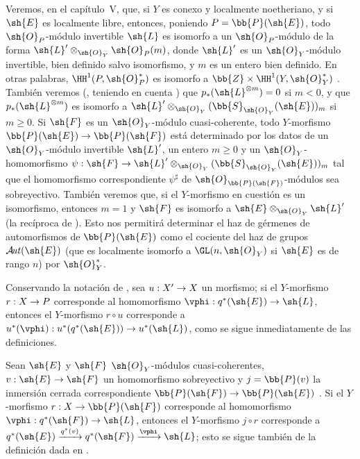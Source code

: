 \documentclass[oneside,10pt]{amsart}
\makeatletter
\renewcommand{\geq}{\geqslant}
\newcommand{\ega@arrow}[2]{\mathchoice{#1}{#2}{#2}{#2}}
\renewcommand{\to}{\ega@arrow{\longrightarrow}{\rightarrow}}
\def\shAut{\mathcal{A}\!\mathit{ut}}
\newcommand{\oldpage}[2][]{\marginnote{\normalfont\footnotesize\textbf{#1}~|~#2}\ignorespaces}
\let\EGAOriginalLabel\label
\renewcommand{\label}[1]{\phantomsection\EGAOriginalLabel{#1}}
\makeatother
\begin{document}
\begin{remark}[4.2.7]
\label{II.4.2.7}
Veremos, en el capítulo~V, que, si $Y$ es conexo y localmente noetheriano, y si $\sh{E}$ es localmente libre, entonces, poniendo $P=\bb{P}(\sh{E})$, todo $\sh{O}_P$-módulo invertible $\sh{L}$ es isomorfo a un $\sh{O}_P$-módulo de la forma $\sh{L}'\otimes_{\sh{O}_Y}\sh{O}_P(m)$, donde $\sh{L}'$ es un $\sh{O}_Y$-módulo invertible, bien definido salvo isomorfismo, y $m$ es un entero bien definido.
En otras palabras, $\HH^1(P,\sh{O}_P^*)$ es isomorfo a $\bb{Z}\times\HH^1(Y,\sh{O}_Y^*)$ .
También veremos (, teniendo en cuenta ) que $p_*(\sh{L}^{\otimes m})=0$ si $m<0$, y que $p_*(\sh{L}^{\otimes m})$ es isomorfo a $\sh{L}'\otimes_{\sh{O}_Y}(\bb{S}_{\sh{O}_Y}(\sh{E}))_m$ si $m\geq0$.
Si $\sh{F}$ es un $\sh{O}_Y$-módulo cuasi-coherente, todo $Y$-morfismo $\bb{P}(\sh{E})\to\bb{P}(\sh{F})$ está determinado por los datos de un $\sh{O}_Y$-módulo invertible $\sh{L}'$, un entero $m\geq0$ y un $\sh{O}_Y$-homomorfismo $\psi:\sh{F}\to\sh{L}'\otimes_{\sh{O}_Y}(\bb{S}_{\sh{O}_Y}(\sh{E}))_m$ tal que el homomorfismo correspondiente $\psi^\sharp$ de $\sh{O}_{\bb{P}(\sh{F})}$-módulos sea sobreyectivo.
También veremos que, si el $Y$-morfismo en cuestión es un isomorfismo, entonces $m=1$ y $\sh{F}$ es isomorfo a $\sh{E}\otimes_{\sh{O}_Y}\sh{L}'$ (la recíproca de ).
Esto nos permitirá determinar el haz de gérmenes de automorfismos de $\bb{P}(\sh{E})$ como el cociente del haz de grupos $\shAut(\sh{E})$ (que es localmente isomorfo a $\GL(n,\sh{O}_Y)$ si $\sh{E}$ es de rango $n$) por $\sh{O}_Y^*$.
\end{remark}

\begin{env}[4.2.8]
\label{II.4.2.8}
Conservando la notación de , sea $u:X'\to X$ un morfismo;
si el $Y$-morfismo $r:X\to P$ corresponde al homomorfismo $\vphi:q^*(\sh{E})\to\sh{L}$, entonces el $Y$-morfismo $r\circ u$ corresponde a $u^*(\vphi):u^*(q^*(\sh{E}))\to u^*(\sh{L})$, como se sigue inmediatamente de las definiciones.
\end{env}

\begin{env}[4.2.9]
\label{II.4.2.9}
Sean $\sh{E}$ y $\sh{F}$ $\sh{O}_Y$-módulos cuasi-coherentes, $v:\sh{E}\to\sh{F}$ un homomorfismo sobreyectivo y $j=\bb{P}(v)$ la inmersión cerrada correspondiente $\bb{P}(\sh{F})\to\bb{P}(\sh{E})$ .
Si el $Y$-morfismo $r:X\to\bb{P}(\sh{F})$ corresponde al homomorfismo $\vphi:q^*(\sh{F})\to\sh{L}$, entonces el
\oldpage[II]{76}
$Y$-morfismo $j\circ r$ corresponde a $q^*(\sh{E})\xrightarrow{q^*(v)}q^*(\sh{F})\xrightarrow{\vphi}\sh{L}$;
esto se sigue también de la definición dada en .
\end{env}
\end{document}
